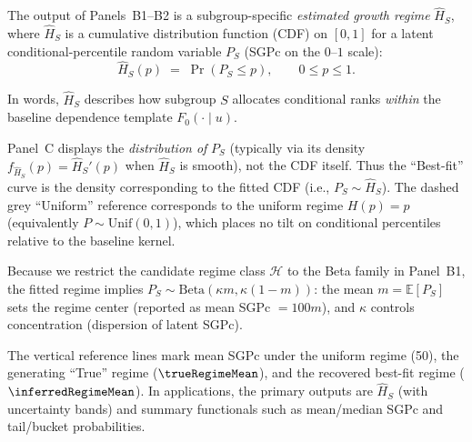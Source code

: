 \documentclass[10pt]{article}
\begin{document}
\noindent
\begin{minipage}[t]{3.75in}
  \vspace{0.05in}
  \hspace{0.15in}%
  \begin{minipage}{3.45in}
    \small\raggedright\color{bodyGrey}

    The output of Panels~B1--B2 is a subgroup-specific \emph{estimated growth regime}
    $\widehat{H}_S$, where $\widehat{H}_S$ is a cumulative distribution function (CDF) on $[0,1]$
    for a latent conditional-percentile random variable $P_S$ (SGPc on the $0$--$1$ scale):
    \[
      \widehat{H}_S(p)\;=\;\Pr(P_S \le p),\qquad 0\le p\le 1.
    \]
    
    \vspace{1pt}
    In words, $\widehat{H}_S$ describes how subgroup $S$ allocates conditional ranks
    \emph{within} the baseline dependence template $F_0(\cdot\mid u)$.
    
    \vspace{4pt}
    Panel~C displays the \emph{distribution of} $P_S$ (typically via its density
    $f_{\widehat{H}_S}(p)=\widehat{H}_S'(p)$ when $\widehat{H}_S$ is smooth), not the CDF itself.
    Thus the ``Best-fit'' curve is the density corresponding to the fitted CDF
    (i.e., $P_S \sim \widehat{H}_S$). The dashed grey ``Uniform'' reference corresponds to the
    uniform regime $H(p)=p$ (equivalently $P\sim\mathrm{Unif}(0,1)$), which places no tilt on
    conditional percentiles relative to the baseline kernel.
    
    \vspace{4pt}
    Because we restrict the candidate regime class $\mathcal{H}$ to the Beta family in Panel~B1,
    the fitted regime implies
    $P_S\sim\mathrm{Beta}(\kappa m,\kappa(1-m))$:
    the mean $m=\mathbb{E}[P_S]$ sets the regime center (reported as mean SGPc $=100m$),
    and $\kappa$ controls concentration (dispersion of latent SGPc).
    
    \vspace{4pt}
    The vertical reference lines mark mean SGPc under the uniform regime (50),
    the generating ``True'' regime ($\trueRegimeMean$), and the recovered best-fit regime
    ($\inferredRegimeMean$). In applications, the primary outputs are $\widehat{H}_S$
    (with uncertainty bands) and summary functionals such as mean/median SGPc and
    tail/bucket probabilities.

  \end{minipage}
  \vspace{0.1in}
\end{minipage}
\end{document}
